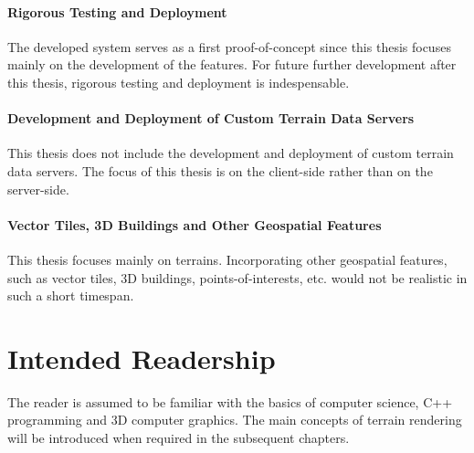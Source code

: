 \paragraph{Rigorous Testing and Deployment} The developed system serves as 
                             a first proof-of-concept since this thesis 
                              focuses mainly on the development of the features.
                              For future further development after this thesis, rigorous testing and deployment
                              is indespensable.

\paragraph{Development and Deployment of Custom Terrain Data Servers} This thesis does not 
                                                         include the development and deployment of custom terrain data servers.
                                                         The focus of this thesis is on the client-side rather than on the server-side.

\paragraph{Vector Tiles, 3D Buildings and Other Geospatial Features} This thesis focuses mainly on terrains.
                                                                Incorporating other geospatial features, such as vector tiles,
                                                                3D buildings, points-of-interests, etc. would 
                                                                not be realistic in such a short timespan.

\section{Intended Readership}
The reader is assumed to be familiar with the basics of computer science,
C++ programming and 3D computer graphics. The main concepts of terrain rendering will be introduced 
when required in the subsequent chapters.

